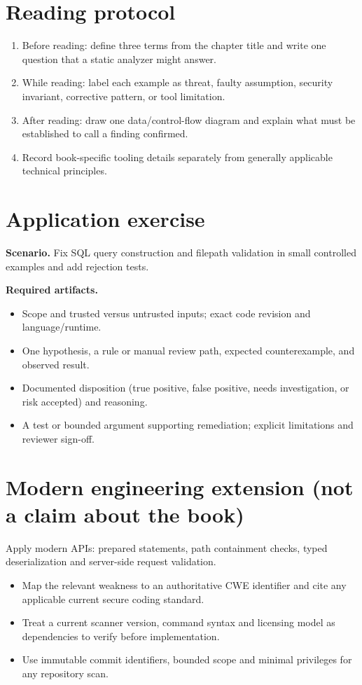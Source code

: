 \documentclass[10pt,letterpaper]{article}
\begin{document}
\section{Reading protocol}
\begin{enumerate}
\item Before reading: define three terms from the chapter title and write one question that a static analyzer might answer.
\item While reading: label each example as threat, faulty assumption, security invariant, corrective pattern, or tool limitation.
\item After reading: draw one data/control-flow diagram and explain what must be established to call a finding confirmed.
\item Record book-specific tooling details separately from generally applicable technical principles.
\end{enumerate}

\section{Application exercise}
\textbf{Scenario.} Fix SQL query construction and filepath validation in small controlled examples and add rejection tests.

\textbf{Required artifacts.}\begin{itemize}
\item Scope and trusted versus untrusted inputs; exact code revision and language/runtime.
\item One hypothesis, a rule or manual review path, expected counterexample, and observed result.
\item Documented disposition (true positive, false positive, needs investigation, or risk accepted) and reasoning.
\item A test or bounded argument supporting remediation; explicit limitations and reviewer sign-off.
\end{itemize}

\section{Modern engineering extension (not a claim about the book)}
Apply modern APIs: prepared statements, path containment checks, typed deserialization and server-side request validation.

\begin{itemize}
\item Map the relevant weakness to an authoritative CWE identifier and cite any applicable current secure coding standard.
\item Treat a current scanner version, command syntax and licensing model as dependencies to verify before implementation.
\item Use immutable commit identifiers, bounded scope and minimal privileges for any repository scan.
\end{itemize}
\end{document}
